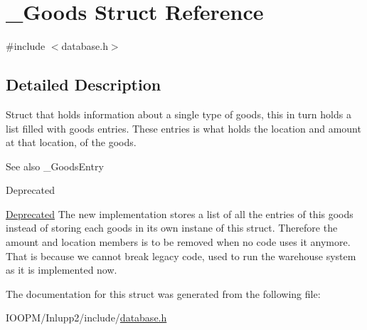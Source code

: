 \hypertarget{struct___goods}{}\section{\+\_\+\+Goods Struct Reference}
\label{struct___goods}


{\ttfamily \#include $<$database.\+h$>$}



\subsection{Detailed Description}
Struct that holds information about a single type of goods, this in turn holds a list filled with goods entries. These entries is what holds the location and amount at that location, of the goods. \begin{DoxySeeAlso}{See also}
\+\_\+\+Goods\+Entry 
\end{DoxySeeAlso}
\begin{DoxyRefDesc}{Deprecated}
\item[\hyperlink{deprecated__deprecated000001}{Deprecated}]The new implementation stores a list of all the entries of this goods instead of storing each goods in its own instane of this struct. Therefore the amount and location members is to be removed when no code uses it anymore. ~\newline
 That is because we cannot break legacy code, used to run the warehouse system as it is implemented now. \end{DoxyRefDesc}


The documentation for this struct was generated from the following file\+:\begin{DoxyCompactItemize}
\item 
I\+O\+O\+P\+M/\+Inlupp2/include/\hyperlink{database_8h}{database.\+h}\end{DoxyCompactItemize}
